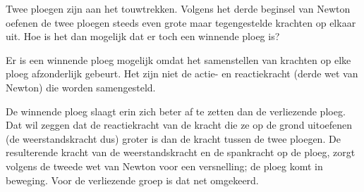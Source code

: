 
\begin{exercise}

 Twee ploegen zijn aan het touwtrekken. Volgens het derde
beginsel van Newton oefenen de twee ploegen steeds even grote maar tegengestelde krachten op elkaar uit. Hoe is het dan mogelijk dat er toch een winnende ploeg is?
\begin{oplossing}
\newline
Er is een winnende ploeg mogelijk omdat het samenstellen van krachten op elke ploeg afzonderlijk gebeurt. Het zijn niet de actie- en reactiekracht (derde wet van Newton) die worden samengesteld. 

De winnende ploeg slaagt erin zich beter af te zetten dan de verliezende ploeg. Dat wil zeggen dat de reactiekracht van de kracht die ze op de grond uitoefenen (de weerstandskracht dus) groter is dan de kracht tussen de twee ploegen. De resulterende kracht van de weerstandskracht en de spankracht op de ploeg, zorgt volgens de tweede wet van Newton voor een versnelling; de ploeg komt in beweging. Voor de verliezende groep is dat net omgekeerd.  
\end{oplossing}

\end{exercise}

